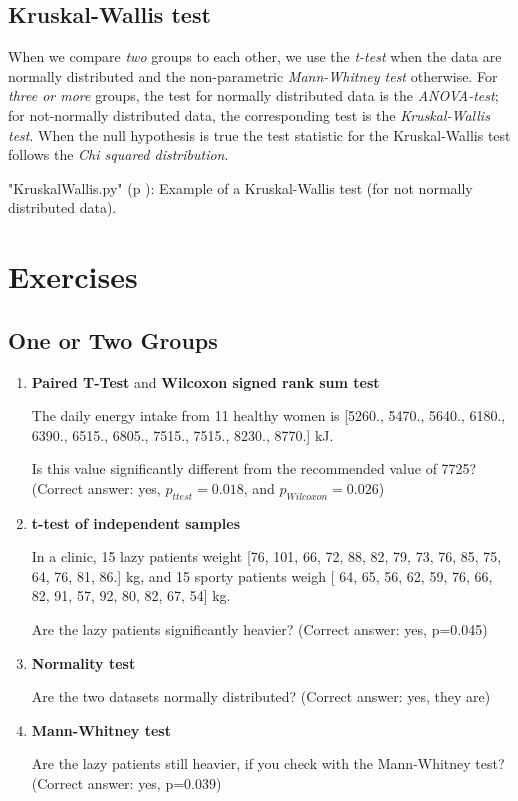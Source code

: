 \subsection{Kruskal-Wallis test}\label{test:Kruskal-Wallis}

When we compare \emph{two} groups to each other, we use the \emph{t-test} when the data are normally distributed and the non-parametric \emph{Mann-Whitney test} otherwise. For \emph{three or more }groups, the test for normally distributed data is the \emph{ANOVA-test}; for not-normally distributed data, the corresponding test is the \emph{Kruskal-Wallis test}. When the null hypothesis is true the test statistic for the Kruskal-Wallis test follows the \emph{Chi squared distribution}.

\PyImg "KruskalWallis.py" (p \pageref{py:KruskalWallis}): Example of a Kruskal-Wallis test (for not normally distributed data).

\section{Exercises}

\subsection*{One or Two Groups}

\begin{enumerate}
  \item \textbf{Paired T-Test} and \textbf{Wilcoxon signed rank sum test}

The daily energy intake from 11 healthy women is [5260., 5470., 5640., 6180., 6390., 6515., 6805., 7515., 7515., 8230., 8770.] kJ.

    Is this value significantly different from the recommended value of 7725?
    (Correct answer: yes, $p_{ttest}=0.018$, and $p_{Wilcoxon}=0.026$)

  \item \textbf{t-test of independent samples}

In a clinic, 15 lazy patients weight [76, 101, 66, 72, 88, 82, 79, 73, 76, 85, 75, 64, 76, 81, 86.] kg, and 15 sporty patients weigh [ 64, 65, 56, 62, 59, 76, 66, 82, 91, 57, 92, 80, 82, 67, 54] kg.

    Are the lazy patients significantly heavier?
    (Correct answer: yes, p=0.045)

  \item \textbf{Normality test}

    Are the two datasets normally distributed?
    (Correct answer: yes, they are)

  \item \textbf{Mann-Whitney test}

    Are the lazy patients still heavier, if you check with the Mann-Whitney test?
    (Correct answer: yes, p=0.039)
\end{enumerate}

